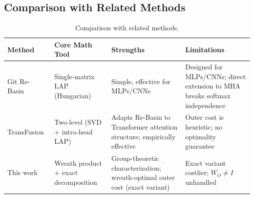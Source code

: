 \subsection{Comparison with Related Methods}

\begin{table}[htbp]
    \centering
    \caption{Comparison with related methods.}
    \label{tab:comparison}
    \small
    \begin{tabular}{p{2.5cm}p{2.5cm}p{2.8cm}p{2.8cm}}
        \toprule
        Method & Core Math Tool & Strengths & Limitations \\
        \midrule
        Git Re-Basin~\cite{Ainsworth2023} & Single-matrix LAP (Hungarian) & Simple, effective for MLPs/CNNs & Designed for MLPs/CNNs; direct extension to MHA breaks softmax independence \\
        \midrule
        TransFusion~\cite{Rinaldi2025} & Two-level (SVD + intra-head LAP) & Adapts Re-Basin to Transformer attention structure; empirically effective & Outer cost is heuristic; no optimality guarantee \\
        \midrule
        This work & Wreath product + exact decomposition & Group-theoretic characterization; wreath-optimal outer cost (exact variant) & Exact variant costlier; $W_O \neq I$ unhandled \\
        \bottomrule
    \end{tabular}
\end{table}
